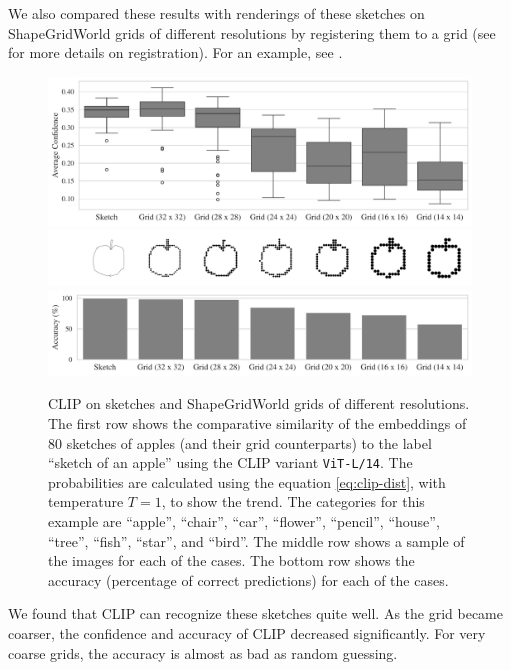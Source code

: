 We also compared these results with renderings of these sketches on ShapeGridWorld grids of different resolutions by registering them to a grid (see  for more details on registration).
For an example, see .
\begin{figure}[h]
    \centering
    \includegraphics[width=\textwidth]{images/grid_comparison.pdf}
    \includegraphics[width=\textwidth]{images/grid_comparison_images.png}
    \includegraphics[width=\textwidth]{images/grid_comparison_accuracy.pdf}
    \caption[CLIP on sketches and ShapeGridWorld grids of different resolutions.]{CLIP on sketches and ShapeGridWorld grids of different resolutions.
    The first row shows the comparative similarity of the embeddings of \(80\) sketches of apples (and their grid counterparts) to the label ``sketch of an apple'' using the CLIP variant \texttt{ViT-L/14}.
    The probabilities are calculated using the equation \eqref{eq:clip-dist}, with temperature \(T = 1\), to show the trend.
    The categories for this example are ``apple'', ``chair'', ``car'', ``flower'', ``pencil'', ``house'', ``tree'', ``fish'', ``star'', and ``bird''.
    The middle row shows a sample of the images for each of the cases.
    The bottom row shows the accuracy (percentage of correct predictions) for each of the cases.
    }
    \label{fig:clip-sketches}
\end{figure}
We found that CLIP can recognize these sketches quite well.
As the grid became coarser, the confidence and accuracy of CLIP decreased significantly.
For very coarse grids, the accuracy is almost as bad as random guessing.

